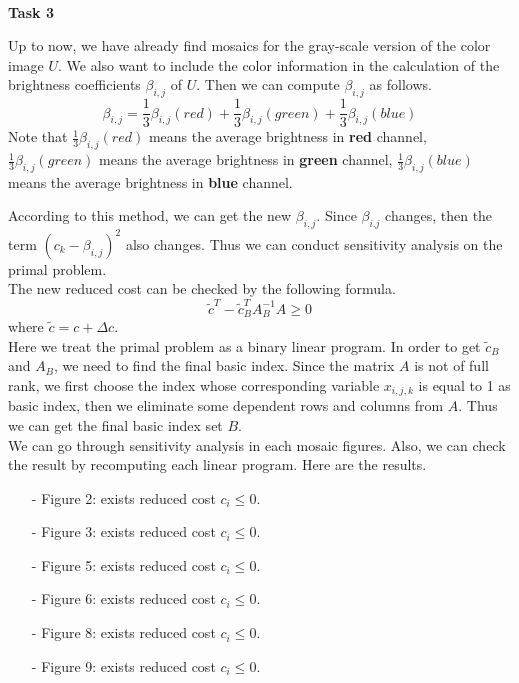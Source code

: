 \documentclass[12pt,a4paper]{article}
\begin{document}
\thispagestyle{empty}
~\\
\normalsize \textbf{Task 3}\\
\par Up to now, we have already find mosaics for the gray-scale version of the color image $U$. We also want to include the color information in the calculation of the brightness coefficients $\beta_{i,j}$ of $U$. Then we can compute $\beta_{i,j}$ as follows.
\begin{equation*}
\beta_{i,j} = \frac{1}{3}\beta_{i,j}(red) + \frac{1}{3}\beta_{i,j}(green) + \frac{1}{3}\beta_{i,j}(blue)
\end{equation*}
Note that $\frac{1}{3}\beta_{i,j}(red)$ means the average brightness in \textbf{red} channel, $\frac{1}{3}\beta_{i,j}(green)$ means the average brightness in \textbf{green} channel, $\frac{1}{3}\beta_{i,j}(blue)$ means the average brightness in \textbf{blue} channel.\\
\par According to this method, we can get the new $\beta_{i,j}$. Since $\beta_{i.j}$ changes, then the term $(c_{k}-\beta_{i,j})^{2}$ also changes. Thus we can conduct sensitivity analysis on the primal problem.\\
\indent The new reduced cost can be checked by the following formula.
\begin{equation*}
\tilde{c}^{T}-\tilde{c}_{B}^{T}A_{B}^{-1}A \geqslant 0
\end{equation*}
where $\tilde{c}=c+\Delta c$.\\
\indent Here we treat the primal problem as a binary linear program. In order to get $\tilde{c}_{B}$ and $A_{B}$, we need to find the final basic index. Since the matrix $A$ is not of full rank, we first choose the index whose corresponding variable $x_{i,j,k}$ is equal to 1 as basic index, then we eliminate some dependent rows and columns from $A$. Thus we can get the final basic index set $B$.\\
\indent We can go through sensitivity analysis in each mosaic figures. Also, we can check the result by recomputing each linear program. Here are the results.
\begin{itemize}
	\item[-] Figure 2: exists reduced cost $c_{i} \leqslant 0$.
	\item[-] Figure 3: exists reduced cost $c_{i} \leqslant 0$.
	\item[-] Figure 5: exists reduced cost $c_{i} \leqslant 0$.
	\item[-] Figure 6: exists reduced cost $c_{i} \leqslant 0$.
	\item[-] Figure 8: exists reduced cost $c_{i} \leqslant 0$.
	\item[-] Figure 9: exists reduced cost $c_{i} \leqslant 0$.
\end{itemize}
\end{document}
